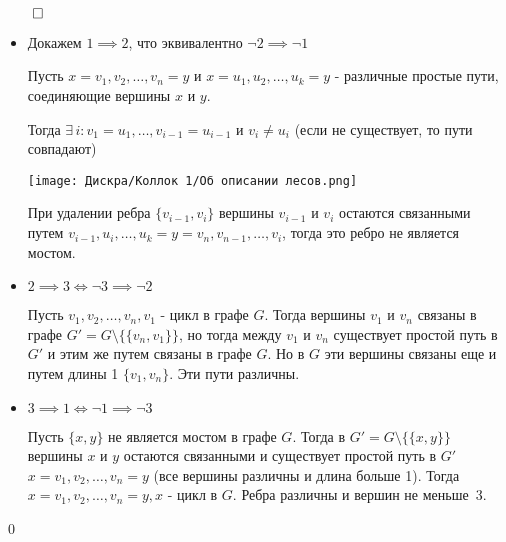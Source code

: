 \documentclass[a4paper,12pt,leqno]{article}
\theoremstyle{plain} %
\theoremstyle{definition} %
\renewenvironment{proof}{$\qed$}{{\qed}} %
\begin{document}
\begin{proof}

\begin{itemize}
    \item Докажем $1 \implies 2$, что эквивалентно $\neg 2 \implies \neg 1$
    
    Пусть $x = v_1, v_2, \dots, v_n = y$ и $x = u_1, u_2, \dots, u_k = y$ - различные простые пути, соединяющие вершины $x$ и $y$.
    
    Тогда $\exists \, i: v_1 = u_1, \dots, v_{i - 1} = u_{i - 1}$ и $v_i \neq u_i$ (если не существует, то пути совпадают)
    
    \texttt{[image: Дискра/Коллок 1/Об описании лесов.png]}
    
    При удалении ребра $\{v_{i-1}, v_i\}$ вершины $v_{i-1}$ и $v_i$ остаются связанными путем $v_{i-1} ,u_i, \dots, u_k = y = v_n, v_{n-1}, \dots, v_i$, тогда это ребро не является мостом.
    
    \item $2 \implies 3 \iff \neg 3 \implies \neg 2$
    
    Пусть $v_1, v_2, \dots, v_n, v_1$ - цикл в графе $G$. Тогда вершины $v_1$ и $v_n$ связаны в графе $G' = G \setminus \{\{v_n, v_1\}\}$, но тогда между $v_1$ и $v_n$ существует простой путь в $G'$ и этим же путем связаны в графе $G$. Но в $G$ эти вершины связаны еще и путем длины 1 $\{v_1, v_n\}$. Эти пути различны.
    
    \item $3 \implies 1 \iff \neg 1 \implies \neg 3$
    
    Пусть $\{x, y\}$ не является мостом в графе $G$. Тогда в $G' = G \setminus \{\{x, y\}\}$ вершины $x$ и $y$ остаются связанными и существует простой путь в $G'$ $x = v_1, v_2, \dots, v_n = y$ (все вершины различны и длина больше 1). Тогда $x = v_1, v_2, \dots, v_n = y, x$ - цикл в $G$. Ребра различны и вершин не меньше~3.
\end{itemize}

\end{proof}
\end{document}

